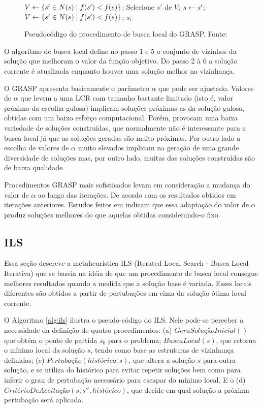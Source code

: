 \begin{figure}[h]
\caption{Pseudocódigo do procedimento de busca local do GRASP. \mbox{Fonte:
\cite{resende1995}}}\label{alg:grasplocal}
\begin{programma}
\STATE $V \leftarrow \{s{'} \in N(s) \mid f(s{'}) < f(s)\}$;
\STATE Selecione $s{'}$ de $V$;
\STATE $s \leftarrow s{'}$;
\STATE $V \leftarrow \{s{'} \in N(s) \mid f(s{'}) < f(s)\}$;
\ENDWHILE
\STATE\RETURN $s$;
\ENDALGORITHM
\end{programma}
\end{figure}

O algoritmo de busca local define no passo 1 e 5 o conjunto de vizinhos da solução que melhoram o valor da função objetivo. Do passo 2 à 6 a solução corrente é atualizada enquanto houver uma solução melhor na vizinhança. 

O GRASP apresenta basicamente o parâmetro $\alpha$ que pode ser ajustado. Valores de $\alpha$ que levem a uma LCR com tamanho bastante limitado (isto é, valor próximo da escolha gulosa) implicam soluções próximas as da solução gulosa, obtidas com um baixo esforço computacional. Porém, provocam uma baixa variedade de soluções construídas, que normalmente não é interessante para a busca local já que as soluções geradas são muito próximas. Por outro lado a escolha de valores de $\alpha$ muito elevados implicam na geração de uma grande diversidade de soluções mas, por outro lado, muitas das soluções construídas são de baixa qualidade.

Procedimentos GRASP mais sofisticados levam em consideração a mudança do valor de $\alpha$ ao longo das iterações. De acordo com os resultados obtidos em iterações anteriores. Estudos feitos em \cite{prais2000} indicam que essa adaptação do valor de $\alpha$ produz soluções melhores do que aquelas obtidas considerando-o fixo.

\subsection{ILS}

Essa seção descreve a metaheurística ILS (Iterated Local Search - Busca Local Iterativa) que se baseia na idéia de que um procedimento de busca local consegue melhores resultados quando a medida que a solução base é variada. Esses locais diferentes são obtidos a partir de pertubações em cima da solução ótima local corrente.

O Algoritmo \ref{alg:ils} ilustra o pseudo-código do ILS. Nele pode-se perceber a necessidade da definição de quatro procedimentos: (a) $GeraSoluçãoInicial()$ que obtém o ponto de partida $s_{0}$ para o problema; $BuscaLocal(s)$, que retorna o mínimo local da solução $s$, tendo como base as estruturas de vizinhança definidas; (c) $Pertubação(histórico, s)$, que altera a solução $s$ para outra solução, e se utiliza do histórico para evitar repetir soluções bem como para inferir o grau de pertubação necessário para escapar do mínimo local. E o (d) $CritérioDeAceitação(s, s{''}, histórico)$, que decide em qual solução a próxima pertubação será aplicada.

